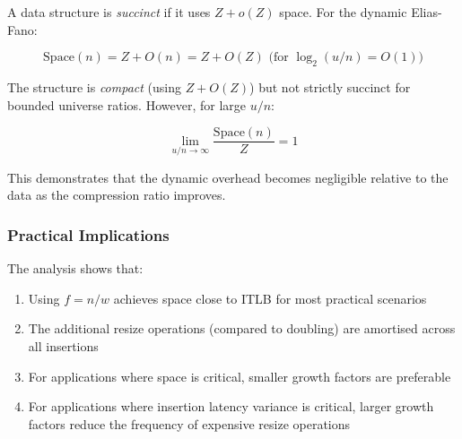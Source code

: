 A data structure is \textit{succinct} if it uses $Z + o(Z)$ space. For the dynamic Elias-Fano:

\begin{equation}
    \text{Space}(n) = Z + O(n) = Z + O(Z) \text{ (for $\log_2(u/n) = O(1)$)}
\end{equation}

The structure is \textit{compact} (using $Z + O(Z)$) but not strictly succinct for bounded universe ratios. However, for large $u/n$:

\begin{equation}
    \lim_{u/n \to \infty} \frac{\text{Space}(n)}{Z} = 1
\end{equation}

This demonstrates that the dynamic overhead becomes negligible relative to the data as the compression ratio improves.

\subsubsection{Practical Implications}

The analysis shows that:
\begin{enumerate}
    \item Using $f = n/w$ achieves space close to ITLB for most practical scenarios
    \item The additional resize operations (compared to doubling) are amortised across all insertions
    \item For applications where space is critical, smaller growth factors are preferable
    \item For applications where insertion latency variance is critical, larger growth factors reduce the frequency of expensive resize operations
\end{enumerate} 

